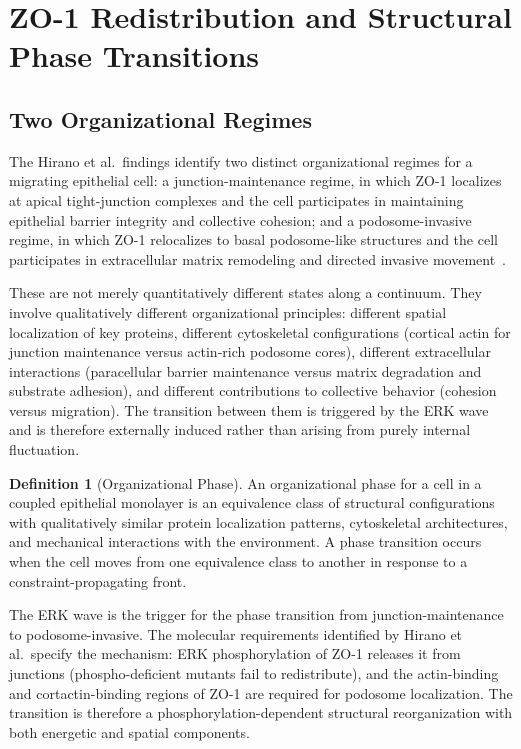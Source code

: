 \documentclass[11pt,a4paper]{article}
\theoremstyle{plain}
\theoremstyle{definition}
\newtheorem{definition}[theorem]{Definition}
\begin{document}
\section{ZO-1 Redistribution and Structural Phase Transitions}
\label{sec:phase}

\subsection{Two Organizational Regimes}

The Hirano et al.\ findings identify two distinct organizational regimes for a migrating
epithelial cell: a junction-maintenance regime, in which ZO-1 localizes at apical
tight-junction complexes and the cell participates in maintaining epithelial barrier
integrity and collective cohesion; and a podosome-invasive regime, in which ZO-1
relocalizes to basal podosome-like structures and the cell participates in extracellular
matrix remodeling and directed invasive movement~\cite{Hirano2026}.

These are not merely quantitatively different states along a continuum. They involve
qualitatively different organizational principles: different spatial localization of
key proteins, different cytoskeletal configurations (cortical actin for junction
maintenance versus actin-rich podosome cores), different extracellular interactions
(paracellular barrier maintenance versus matrix degradation and substrate adhesion),
and different contributions to collective behavior (cohesion versus migration).
The transition between them is triggered by the ERK wave and is therefore externally
induced rather than arising from purely internal fluctuation.

\begin{definition}[Organizational Phase]
An organizational phase for a cell in a coupled epithelial monolayer is an equivalence
class of structural configurations with qualitatively similar protein localization patterns,
cytoskeletal architectures, and mechanical interactions with the environment. A phase
transition occurs when the cell moves from one equivalence class to another in response
to a constraint-propagating front.
\end{definition}

The ERK wave is the trigger for the phase transition from junction-main\-te\-nance to
podosome-invasive. The molecular requirements identified by Hirano et al.\ specify the
mechanism: ERK phosphorylation of ZO-1 releases it from junctions (phospho-deficient
mutants fail to redistribute), and the actin-binding and cortactin-binding regions of
ZO-1 are required for podosome localization. The transition is therefore a
phosphorylation-dependent structural reorganization with both energetic and spatial
components.
\end{document}
